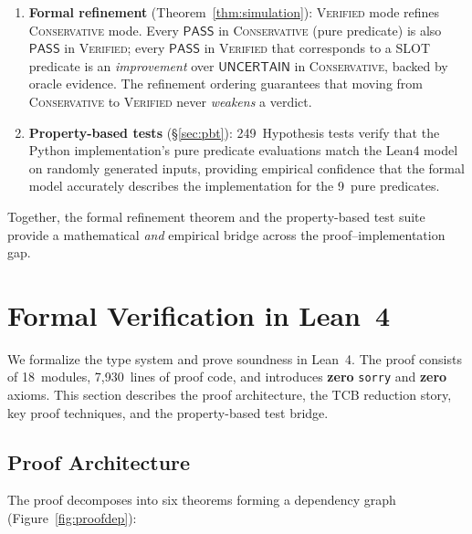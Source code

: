 \documentclass[acmsmall,review,anonymous]{acmart}
\newcommand{\PASS}{\ensuremath{\mathsf{PASS}}\xspace}
\newcommand{\UNCERTAIN}{\ensuremath{\mathsf{UNCERTAIN}}\xspace}
\newcommand{\CONSERVATIVE}{\textsc{Conservative}\xspace}
\newcommand{\VERIFIED}{\textsc{Verified}\xspace}
\begin{document}
\begin{enumerate}[leftmargin=*,itemsep=1pt,topsep=2pt]
\item \textbf{Formal refinement} (Theorem~\ref{thm:simulation}):
  \VERIFIED{} mode refines \CONSERVATIVE{} mode.
  Every \PASS{} in \CONSERVATIVE{} (pure predicate) is also \PASS{}
  in \VERIFIED{}; every \PASS{} in \VERIFIED{} that corresponds to a
  SLOT predicate is an \emph{improvement} over \UNCERTAIN{} in
  \CONSERVATIVE{}, backed by oracle evidence.
  The refinement ordering guarantees that moving from
  \CONSERVATIVE{} to \VERIFIED{} never \emph{weakens} a verdict.

\item \textbf{Property-based tests} (\S\ref{sec:pbt}):
  249~Hypothesis tests verify that the Python implementation's pure
  predicate evaluations match the Lean4 model on randomly generated
  inputs, providing empirical confidence that the formal model
  accurately describes the implementation for the 9~pure predicates.
\end{enumerate}

Together, the formal refinement theorem and the property-based test
suite provide a mathematical \emph{and} empirical bridge across the
proof--implementation gap.

\section{Formal Verification in Lean~4}\label{sec:proof}

We formalize the type system and prove soundness in Lean~4.
The proof consists of 18~modules, 7{,}930~lines of proof code, and
introduces \textbf{zero} \texttt{sorry} and \textbf{zero} axioms.
This section describes the proof architecture, the TCB reduction story,
key proof techniques, and the property-based test bridge.

\subsection{Proof Architecture}\label{sec:proof-arch}

The proof decomposes into six theorems forming a dependency
graph (Figure~\ref{fig:proofdep}):
\end{document}
